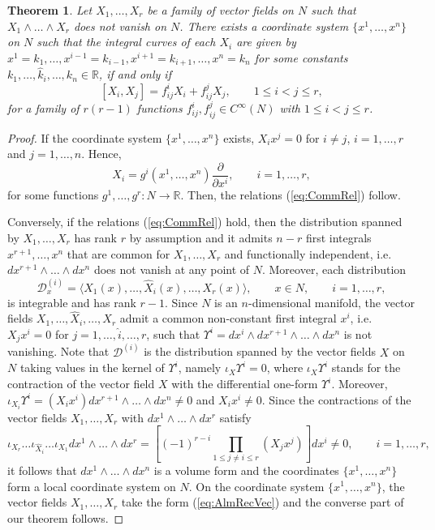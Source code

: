 \documentclass[12pt]{article}
\theoremstyle{plain}
\newtheorem{theorem}{Theorem}[section]
\theoremstyle{definition}
\numberwithin{equation}{section}
\begin{document}
\begin{theorem}\label{Th::RecBasis}Let $X_1,\ldots ,X_r$ be a family of vector fields on  $N$ such that $X_1\wedge\ldots\wedge X_r$ does not vanish on $N$. There exists a  coordinate system $\{x^1,\ldots,x^n\}$  on $N$ such that the integral curves of each $X_i$ are given by $x^1=k_1,\ldots,{x}^{i-1}=k_{i-1},{x}^{i+1}=k_{i+1},\ldots,x^n=k_n$  for some constants $k_1,\ldots,\hat{k}_{i},\ldots, k_n\in \mathbb{R}$, if and only if
\begin{equation}\label{eq:CommRel}
[X_i,X_j]=f_{ij}^iX_i+f_{ij}^jX_j,\qquad 1\leq i<j\leq r,
\end{equation}
for a family of $r(r-1)$ functions $f_{ij}^i,f_{ij}^j\in C^\infty(N)$ with $1\leq i<j\leq r$.
\end{theorem}
\begin{proof} If the coordinate system $\{x^1,\ldots,x^n\}$ exists, $X_ix^j=0$ for $i\neq j$, $i=1,\ldots,r$ and $j=1,\ldots,n$. Hence,
\begin{equation}\label{eq:AlmRecVec}
    X_i=
g^i(x^1,\ldots,x^n)\frac{\partial}{\partial x^i},\qquad i=1,\ldots,r,
\end{equation}
for some functions $g^1,\ldots,g^r:N\rightarrow \mathbb{R}$. Then, the relations (\ref{eq:CommRel}) follow. 

Conversely, if the relations (\ref{eq:CommRel}) hold, then the distribution spanned by $X_1,\ldots,X_r$ has rank $r$ by assumption and it admits $n-r$ first integrals $x^{r+1},\ldots,x^n$ that are common for $X_1,\ldots,X_r$ and  functionally independent, i.e. $dx^{r+1}\wedge \ldots\wedge dx^n$ does not vanish at any point of $N$. Moreover, each distribution 
$$
\mathcal{D}^{(i)}_x=\langle X_1(x),\ldots,\hat{X}_{i}(x),\ldots,X_r(x)\rangle,\qquad x\in N,\qquad i=1,\ldots,r,
$$  
is integrable and has rank $r-1$. Since $N$ is an $n$-dimensional manifold, the vector fields $X_1,\ldots,\hat{X}_{i},\ldots,X_r$  admit a common non-constant first integral $x^i$, i.e. $X_jx^i=0$ for $j=1,\ldots,\hat{i},\ldots,r$, such that $\Upsilon^i=dx^i\wedge dx^{r+1}\wedge\ldots\wedge dx^n$ is not vanishing. Note that $\mathcal{D}^{(i)}$ is the distribution spanned by the vector fields $X$ on $N$ taking values in the kernel of $\Upsilon^i$, namely $\iota_X\Upsilon^i=0$, where $\iota_X\Upsilon^i$ stands for the contraction of the vector field $X$ with the differential one-form $\Upsilon^i$. Moreover, $\iota_{X_i}\Upsilon^i=(X_ix^i)dx^{r+1}\wedge \ldots \wedge dx^n\neq 0$ and $X_ix^i\neq 0$. Since the contractions of the vector fields $X_1,\ldots,X_r$ with $dx^1\wedge\ldots\wedge dx^r$ satisfy
$$
\iota_{X_r}\ldots\iota_{\hat{X}_{i}}\ldots\iota_{X_1}dx^1\wedge\ldots\wedge dx^r=\left[(-1)^{r-i}\prod_{1\leq j\neq i\leq r}(X_jx^j)\right]dx^i\neq 0,\qquad i=1,\ldots,r,
$$
it follows that $dx^1\wedge \ldots\wedge dx^n$ is a volume form and the coordinates $\{x^1,\ldots,x^n\}$ form a local coordinate system on $N$.  On the coordinate system $\{x^1,\ldots,x^n\}$, the vector fields $X_1,\ldots,X_r$ take the form (\ref{eq:AlmRecVec}) and the converse part of our theorem follows.
\end{proof}
\end{document}
